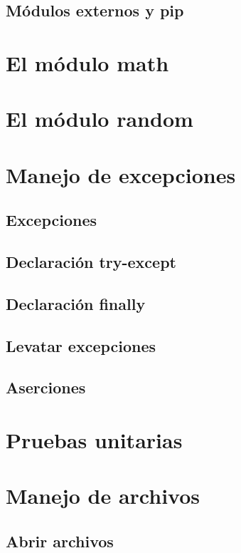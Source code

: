 \documentclass{article}
\begin{document}
\subsection{Módulos externos y pip}

\section{El módulo math}

\section{El módulo random}

\section{Manejo de excepciones}

\subsection{Excepciones}

\subsection{Declaración try-except}

\subsection{Declaración finally}

\subsection{Levatar excepciones}

\subsection{Aserciones}

\section{Pruebas unitarias}

\section{Manejo de archivos}

\subsection{Abrir archivos}
\end{document}
